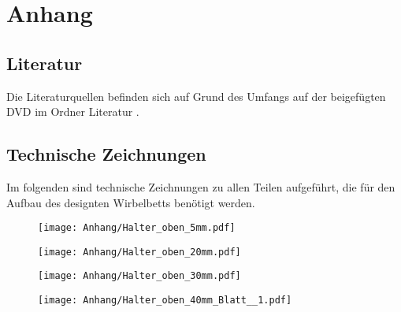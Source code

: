 {}










{}


\chapter*{Anhang}

\pagestyle{plain}

\section*{Literatur}

Die Literaturquellen befinden sich auf Grund des Umfangs auf der beigefügten DVD im Ordner \glqq Literatur \grqq .

\section*{Technische Zeichnungen}

Im folgenden sind technische Zeichnungen zu allen Teilen aufgeführt, die für den Aufbau des designten Wirbelbetts benötigt werden.



\captionsetup{listof=false}

\begin{figure}  
	\texttt{[image: Anhang/Halter\_oben\_5mm.pdf]}
\end{figure}

\begin{figure}  
	\texttt{[image: Anhang/Halter\_oben\_20mm.pdf]}
\end{figure}

\begin{figure}  
	\texttt{[image: Anhang/Halter\_oben\_30mm.pdf]}
\end{figure}

\begin{figure}  
	\texttt{[image: Anhang/Halter\_oben\_40mm\_Blatt\_\_1.pdf]}
\end{figure}

